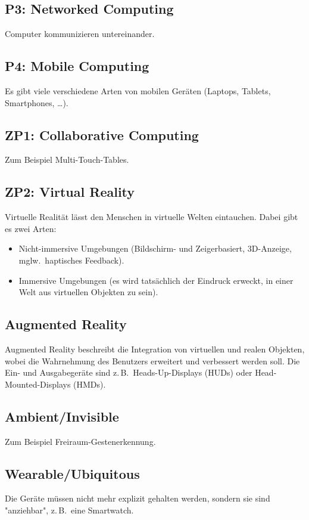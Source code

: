 \documentclass[a4paper, 11pt, accentcolor = tud3b]{tudreport}
\newcommand{\zB}{z.\,B.~}
\newcommand{\mglw}{mglw.~}
\begin{document}
			\subsection{P3: Networked Computing}
				Computer kommunizieren untereinander.

			\subsection{P4: Mobile Computing}
				Es gibt viele verschiedene Arten von mobilen Geräten (Laptops, Tablets, Smartphones, \dots).

			\subsection{ZP1: Collaborative Computing}
				Zum Beispiel Multi-Touch-Tables.

			\subsection{ZP2: Virtual Reality}
				Virtuelle Realität lässt den Menschen in virtuelle Welten eintauchen. Dabei gibt es zwei Arten:
				\begin{itemize}
					\item Nicht-immersive Umgebungen (Bildschirm- und Zeigerbasiert, 3D-Anzeige, \mglw haptisches Feedback).
					\item Immersive Umgebungen (es wird tatsächlich der Eindruck erweckt, in einer Welt aus virtuellen Objekten zu sein).
				\end{itemize}

			\subsection{Augmented Reality}
				Augmented Reality beschreibt die Integration von virtuellen und realen Objekten, wobei die Wahrnehmung des Benutzers erweitert und verbessert werden soll. Die Ein- und Ausgabegeräte sind \zB Heads-Up-Displays (HUDs) oder Head-Mounted-Displays (HMDs).

			\subsection{Ambient/Invisible}
				Zum Beispiel Freiraum-Gestenerkennung.

			\subsection{Wearable/Ubiquitous}
				Die Geräte müssen nicht mehr explizit gehalten werden, sondern sie sind "anziehbar", \zB eine Smartwatch.
\end{document}
